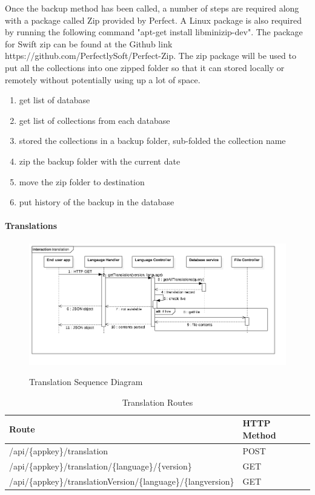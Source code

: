 Once the backup method has been called, a number of steps are required along with a package called Zip provided by Perfect. A Linux package is also required by running the following command "apt-get install libminizip-dev". The package for Swift zip can be found at the Github link https://github.com/PerfectlySoft/Perfect-Zip. The zip package will be used to put all the collections into one zipped folder so that it can stored locally or remotely without potentially using up a lot of space.

\begin{enumerate}
  \item get list of database 
  \item get list of collections from each database
  \item stored the collections in a backup folder, sub-folded the collection name
  \item zip the backup folder with the current date
  \item move the zip folder to destination
  \item put history of the backup in the database
\end{enumerate}

\paragraph{Translations}

\begin{figure}[!h]
    \caption{Translation Sequence Diagram}
    \centering
    \includegraphics[width=150mm]{images/sequence/translation}
    \label{fig:translation-s}
\end{figure}

\begin{table}[!h]
\centering
\caption{Translation Routes}
\label{tb:translation-routes}
\begin{tabular}{|l|l|}
\hline
\rowcolor{green!20}
Route                                        & HTTP Method \\ \hline
/api/\{appkey\}/translation                  & POST        \\ \hline
/api/\{appkey\}/translation/\{language\}/\{version\}           & GET         \\ \hline
/api/\{appkey\}/translationVersion/\{language\}/\{langversion\} & GET         \\ \hline
\end{tabular}
\end{table}

